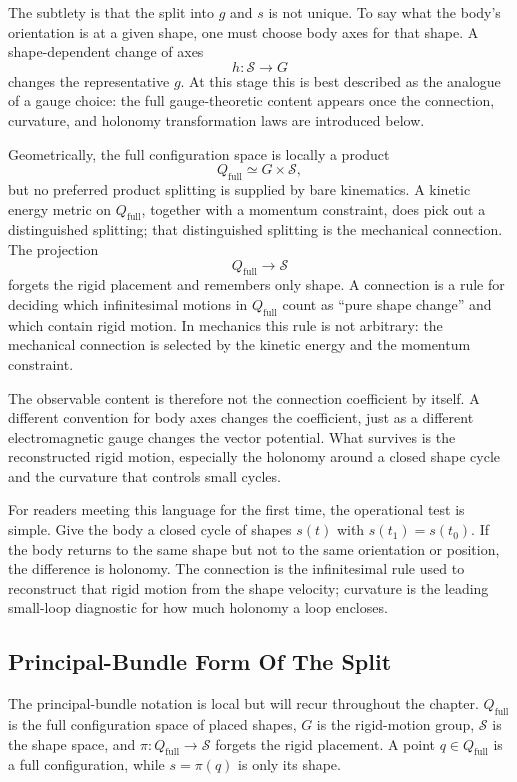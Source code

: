 The subtlety is that the split into \(g\) and \(s\) is not unique. To say what
the body's orientation is at a given shape, one must choose body axes for that
shape. A shape-dependent change of axes
\[
  h:\mathcal S\to G
\]
changes the representative \(g\). At this stage this is best described as the
analogue of a gauge choice: the full gauge-theoretic content appears once the
connection, curvature, and holonomy transformation laws are introduced below.

Geometrically, the full configuration space is locally a product
\[
  Q_{\mathrm{full}}\simeq G\times\mathcal S,
\]
but no preferred product splitting is supplied by bare kinematics. A kinetic
energy metric on \(Q_{\mathrm{full}}\), together with a momentum constraint,
does pick out a distinguished splitting; that distinguished splitting is the
mechanical connection. The projection
\[
  Q_{\mathrm{full}}\to\mathcal S
\]
forgets the rigid placement and remembers only shape. A connection is a rule
for deciding which infinitesimal motions in \(Q_{\mathrm{full}}\) count as
``pure shape change'' and which contain rigid motion. In mechanics this rule is
not arbitrary: the mechanical connection is selected by the kinetic energy and
the momentum constraint.

The observable content is therefore not the connection coefficient by itself.
A different convention for body axes changes the coefficient, just as a
different electromagnetic gauge changes the vector potential. What survives is
the reconstructed rigid motion, especially the holonomy around a closed shape
cycle and the curvature that controls small cycles.

For readers meeting this language for the first time, the operational test is
simple.  Give the body a closed cycle of shapes \(s(t)\) with \(s(t_1)=s(t_0)\).
If the body returns to the same shape but not to the same orientation or
position, the difference is holonomy.  The connection is the infinitesimal rule
used to reconstruct that rigid motion from the shape velocity; curvature is the
leading small-loop diagnostic for how much holonomy a loop encloses.

\subsection{Principal-Bundle Form Of The Split}
\label{subsec:deforming-body-principal-bundle}

The principal-bundle notation is local but will recur throughout the chapter.
\(Q_{\mathrm{full}}\) is the full configuration space of placed shapes,
\(G\) is the rigid-motion group, \(\mathcal S\) is the shape space, and
\(\pi:Q_{\mathrm{full}}\to\mathcal S\) forgets the rigid placement.  A point
\(q\in Q_{\mathrm{full}}\) is a full configuration, while
\(s=\pi(q)\) is only its shape.

